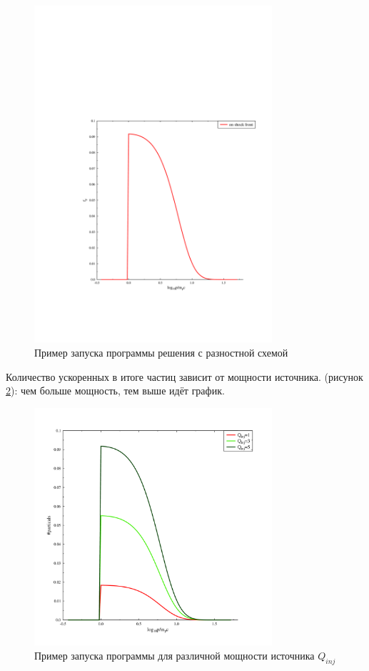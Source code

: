 \documentclass[a4paper,14pt]{extarticle} %
\begin{document}
\begin{figure}[!htb]
\centering
\includegraphics[width=250pt]{r_common}
\caption{Пример запуска программы решения с разностной схемой}
\label{res/razn/common}
\end{figure}
Количество ускоренных в итоге частиц зависит от мощности источника. (рисунок \ref{res/razn/Qinj}): чем больше мощность, тем выше идёт график.
\begin{figure}[!htb]
\centering
\includegraphics[width=250pt]{r_Qinj}
\caption{Пример запуска программы для различной мощности источника $Q_{inj}$}
\label{res/razn/Qinj}
\end{figure}
\end{document}
